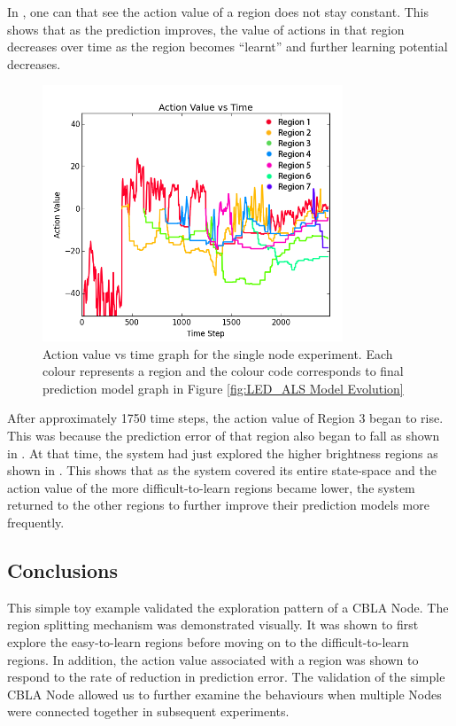 In , one can that see the action value of a region does not stay constant. This shows that as the prediction improves, the value of actions in that region decreases over time as the region becomes ``learnt'' and further learning potential decreases. 

\begin{figure} [!htb]
	\centering
	\includegraphics[width=0.8\textwidth]{"fig/validations/LED_ALS Action Value vs Time"}
	\caption[Action value vs time graph for the single node experiment]{Action value vs time graph for the single node experiment. Each colour represents a region and the colour code corresponds to final prediction model graph in Figure \ref{fig:LED_ALS Model Evolution} }
	\label{fig:LED_ALS Action Value vs Time}
\end{figure}

After approximately 1750 time steps, the action value of Region 3 began to rise. This was because the prediction error of that region also began to fall as shown in . At that time, the system had just explored the higher brightness regions as shown in . This shows that as the system covered its entire state-space and the action value of the more difficult-to-learn regions became lower, the system returned to the other regions to further improve their prediction models more frequently.

\subsection{Conclusions}

This simple toy example validated the exploration pattern of a CBLA Node. The region splitting mechanism was demonstrated visually. It was shown to first explore the easy-to-learn regions before moving on to the difficult-to-learn regions. In addition, the action value associated with a region was shown to respond to the rate of reduction in prediction error. The validation of the simple CBLA Node allowed us to further examine the behaviours when multiple Nodes were connected together in subsequent experiments.

